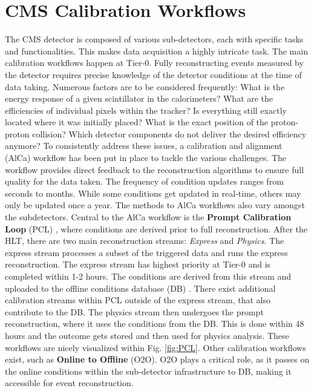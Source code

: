 \section{CMS Calibration Workflows}\label{sec:CMScalibration}
The CMS detector is composed of various sub-detectors, each with specific tasks and functionalities. This makes data acquisition a highly intricate task. The main calibration workflows happen at Tier-0. Fully reconstructing events measured by the detector requires precise knowledge of the detector conditions at the time of data taking. Numerous factors are to be considered frequently: What is the energy response of a given scintillator in the calorimeters? What are the efficiencies of individual pixels within the tracker? Is everything still exactly located where it was initially placed? What is the exact position of the proton-proton collision? Which detector components do not deliver the desired efficiency anymore? To consistently address these issues, a calibration and alignment (AlCa) workflow has been put in place to tackle the various challenges. The workflow provides direct feedback to the reconstruction algorithms to ensure full quality for the data taken. The frequency of condition updates ranges from seconds to months. While some conditions get updated in real-time, others may only be updated once a year. The methods to AlCa workflows also vary amongst the subdetectors.
\newline \newline
Central to the AlCa workflow is the \textbf{Prompt Calibration Loop} (PCL) \cite{David_Futyan_2010,Cerminara_2015}, where conditions are derived prior to full reconstruction. After the HLT, there are two main reconstruction streams: \textit{Express} and \textit{Physics}. The express stream processes a subset of the triggered data and runs the express reconstruction. The express stream has highest priority at Tier-0 and is completed within 1-2 hours. The conditions are derived from this stream and uploaded to the offline conditions database (DB) \cite{di2015cms}. There exist additional calibration streams within PCL outside of the express stream, that also contribute to the DB.
The physics stream then undergoes the prompt reconstruction, where it uses the conditions from the DB. This is done within 48 hours and the outcome gets stored and then used for physics analysis. These workflows are nicely visualized within Fig. \ref{fig:PCL}. Other calibration workflows exist, such as \textbf{Online to Offline} (O2O). O2O plays a critical role, as it passes on the online conditions within the sub-detector infrastructure to DB, making it accessible for event reconstruction.
